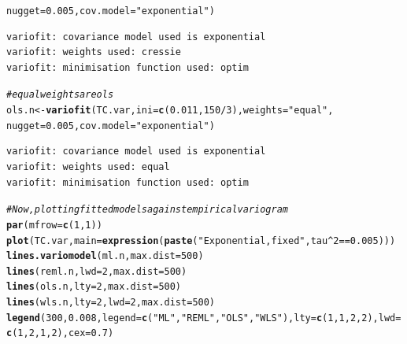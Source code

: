 \documentclass{article}\usepackage[]{graphicx}\usepackage[]{color}
\makeatletter
\newcommand{\hlnum}[1]{\textcolor[rgb]{0.686,0.059,0.569}{#1}}%
\newcommand{\hlstr}[1]{\textcolor[rgb]{0.192,0.494,0.8}{#1}}%
\newcommand{\hlcom}[1]{\textcolor[rgb]{0.678,0.584,0.686}{\textit{#1}}}%
\newcommand{\hlopt}[1]{\textcolor[rgb]{0,0,0}{#1}}%
\newcommand{\hlstd}[1]{\textcolor[rgb]{0.345,0.345,0.345}{#1}}%
\newcommand{\hlkwb}[1]{\textcolor[rgb]{0.69,0.353,0.396}{#1}}%
\newcommand{\hlkwc}[1]{\textcolor[rgb]{0.333,0.667,0.333}{#1}}%
\newcommand{\hlkwd}[1]{\textcolor[rgb]{0.737,0.353,0.396}{\textbf{#1}}}%
\newenvironment{kframe}{%
 \def\at@end@of@kframe{}%
 \ifinner\ifhmode%
  \def\at@end@of@kframe{\end{minipage}}%
  \begin{minipage}{\columnwidth}%
 \fi\fi%
 \def\FrameCommand##1{\hskip\@totalleftmargin \hskip-\fboxsep
 \colorbox{shadecolor}{##1}\hskip-\fboxsep
     \hskip-\linewidth \hskip-\@totalleftmargin \hskip\columnwidth}%
 \MakeFramed {\advance\hsize-\width
   \@totalleftmargin\z@ \linewidth\hsize
   \@setminipage}}%
 {\par\unskip\endMakeFramed%
 \at@end@of@kframe}
\newenvironment{knitrout}{}{} %
\makeatother
\begin{document}
\begin{enumerate}
\begin{enumerate}
\begin{knitrout}
\begin{kframe}
\begin{alltt}
                  \hlkwc{nugget}\hlstd{=}\hlnum{0.005}\hlstd{,} \hlkwc{cov.model} \hlstd{=} \hlstr{"exponential"}\hlstd{)}
\end{alltt}
\begin{verbatim}
variofit: covariance model used is exponential 
variofit: weights used: cressie 
variofit: minimisation function used: optim 
\end{verbatim}
\begin{alltt}
\hlcom{# equal weights are ols}
\hlstd{ols.n} \hlkwb{<-} \hlkwd{variofit}\hlstd{(TC.var,} \hlkwc{ini} \hlstd{=} \hlkwd{c}\hlstd{(}\hlnum{0.011}\hlstd{,}\hlnum{150}\hlopt{/}\hlnum{3}\hlstd{),} \hlkwc{weights} \hlstd{=} \hlstr{"equal"}\hlstd{,}
                  \hlkwc{nugget}\hlstd{=}\hlnum{0.005}\hlstd{,} \hlkwc{cov.model} \hlstd{=} \hlstr{"exponential"}\hlstd{)}
\end{alltt}
\begin{verbatim}
variofit: covariance model used is exponential 
variofit: weights used: equal 
variofit: minimisation function used: optim 
\end{verbatim}
\begin{alltt}
\hlcom{# Now, plotting fitted models against empirical variogram}
\hlkwd{par}\hlstd{(}\hlkwc{mfrow} \hlstd{=} \hlkwd{c}\hlstd{(}\hlnum{1}\hlstd{,}\hlnum{1}\hlstd{))}
\hlkwd{plot}\hlstd{(TC.var,} \hlkwc{main} \hlstd{=} \hlkwd{expression}\hlstd{(}\hlkwd{paste}\hlstd{(}\hlstr{"Exponential, fixed "}\hlstd{, tau}\hlopt{^}\hlnum{2} \hlopt{==} \hlnum{0.005}\hlstd{)))}
\hlkwd{lines.variomodel}\hlstd{(ml.n,} \hlkwc{max.dist} \hlstd{=} \hlnum{500}\hlstd{)}
\hlkwd{lines}\hlstd{(reml.n,} \hlkwc{lwd} \hlstd{=} \hlnum{2}\hlstd{,} \hlkwc{max.dist} \hlstd{=} \hlnum{500}\hlstd{)}
\hlkwd{lines}\hlstd{(ols.n,} \hlkwc{lty} \hlstd{=} \hlnum{2}\hlstd{,} \hlkwc{max.dist} \hlstd{=} \hlnum{500}\hlstd{)}
\hlkwd{lines}\hlstd{(wls.n,} \hlkwc{lty} \hlstd{=} \hlnum{2}\hlstd{,} \hlkwc{lwd} \hlstd{=} \hlnum{2}\hlstd{,} \hlkwc{max.dist} \hlstd{=} \hlnum{500}\hlstd{)}
\hlkwd{legend}\hlstd{(}\hlnum{300}\hlstd{,} \hlnum{0.008}\hlstd{,} \hlkwc{legend}\hlstd{=}\hlkwd{c}\hlstd{(}\hlstr{"ML"}\hlstd{,}\hlstr{"REML"}\hlstd{,}\hlstr{"OLS"}\hlstd{,}\hlstr{"WLS"}\hlstd{),}\hlkwc{lty}\hlstd{=}\hlkwd{c}\hlstd{(}\hlnum{1}\hlstd{,}\hlnum{1}\hlstd{,}\hlnum{2}\hlstd{,}\hlnum{2}\hlstd{),}\hlkwc{lwd}\hlstd{=}\hlkwd{c}\hlstd{(}\hlnum{1}\hlstd{,}\hlnum{2}\hlstd{,}\hlnum{1}\hlstd{,}\hlnum{2}\hlstd{),} \hlkwc{cex}\hlstd{=}\hlnum{0.7}\hlstd{)}
\end{alltt}
\end{kframe}


\end{knitrout}
\end{enumerate}
\end{enumerate}
\end{document}

